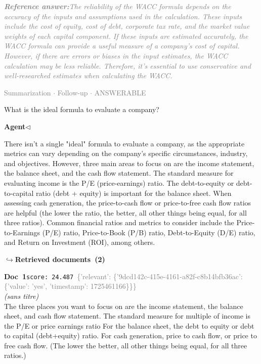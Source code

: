 \documentclass[a4paper,11pt]{article}
\begin{document}
\begin{refanswerenv}
{\footnotesize\textit{\textcolor{gray}{\textbf{Reference answer:}\enspace The reliability of the WACC formula depends on the accuracy of the inputs and assumptions used in the calculation. These inputs include the cost of equity, cost of debt, corporate tax rate, and the market value weights of each capital component. If these inputs are estimated accurately, the WACC formula can provide a useful measure of a company's cost of capital. However, if there are errors or biases in the input estimates, the WACC calculation may be less reliable. Therefore, it's essential to use conservative and well-researched estimates when calculating the WACC.}}}
\end{refanswerenv}
\vspace{0.5em}
\hfill{\tiny\textcolor{gray}{Summarization $\cdot$ Follow-up $\cdot$ ANSWERABLE}}
\begin{userbubble}
What is the ideal formula to evaluate a company?
\end{userbubble}
\noindent\hfill{\small\textcolor{agentcolor}{\textbf{Agent\enspace$\triangleleft$}}}
\begin{agentbubble}
There isn't a single "ideal" formula to evaluate a company, as the appropriate metrics can vary depending on the company's specific circumstances, industry, and objectives. However, three main areas to focus on are the income statement, the balance sheet, and the cash flow statement. The standard measure for evaluating income is the P/E (price-earnings) ratio. The debt-to-equity or debt-to-capital ratio (debt + equity) is important for the balance sheet. When assessing cash generation, the price-to-cash flow or price-to-free cash flow ratios are helpful (the lower the ratio, the better, all other things being equal, for all three ratios). Common financial ratios and metrics to consider include the Price-to-Earnings (P/E) ratio, Price-to-Book (P/B) ratio, Debt-to-Equity (D/E) ratio, and Return on Investment (ROI), among others.
\end{agentbubble}
\noindent\hfill{\footnotesize\textcolor{doccolor}{\textbf{$\hookrightarrow$\enspace Retrieved documents~(2)}}}
\begin{docenv}
{\footnotesize\textcolor{doccolor}{\textbf{Doc~1}}}\hfill{\tiny\texttt{score:~24.487}}\ {\tiny\textcolor{gray}{\{'relevant': \{'9dcd142c-415e-4161-a82f-c8b14bfb36ac': \{'value': 'yes', 'timestamp': 1725461166\}\}\}}}\\[3pt]
{\small\textit{(sans titre)}}\\[2pt]
\vspace{2pt}
{\footnotesize 
The three places you want to focus on are the income statement, the balance sheet, and cash flow statement. The standard measure for multiple of income is the P/E or price earnings ratio  For the balance sheet, the debt to equity or debt to capital (debt+equity) ratio. For cash generation, price to cash flow, or price to free cash flow. (The lower the better, all other things being equal, for all three ratios.)}
\end{docenv}
\end{document}
